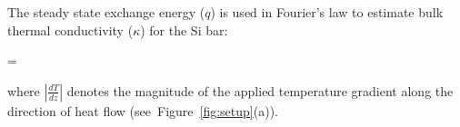 The steady state exchange energy ($q$) is used in Fourier's law to estimate bulk thermal conductivity ($\kappa$)
for the Si  bar:

\be
 \kappa =  
\ee

\noindent where $\left|\frac{dT}{dz}\right|$ denotes the magnitude of the applied temperature gradient along the 
direction of heat flow (see~Figure~\ref{fig:setup}(a)).





























